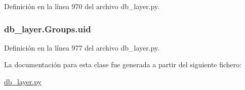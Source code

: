 Definición en la línea 970 del archivo db\-\_\-layer.\-py.

\hypertarget{classdb__layer_1_1_groups_a392e40281e072b1c43e562928f656a1e}{
\subsubsection[{uid}]{\setlength{\rightskip}{0pt plus 5cm}db\-\_\-layer.\-Groups.\-uid}}\label{classdb__layer_1_1_groups_a392e40281e072b1c43e562928f656a1e}


Definición en la línea 977 del archivo db\-\_\-layer.\-py.



La documentación para esta clase fue generada a partir del siguiente fichero\-:\begin{DoxyCompactItemize}
\item 
\hyperlink{db__layer_8py}{db\-\_\-layer.\-py}\end{DoxyCompactItemize}
